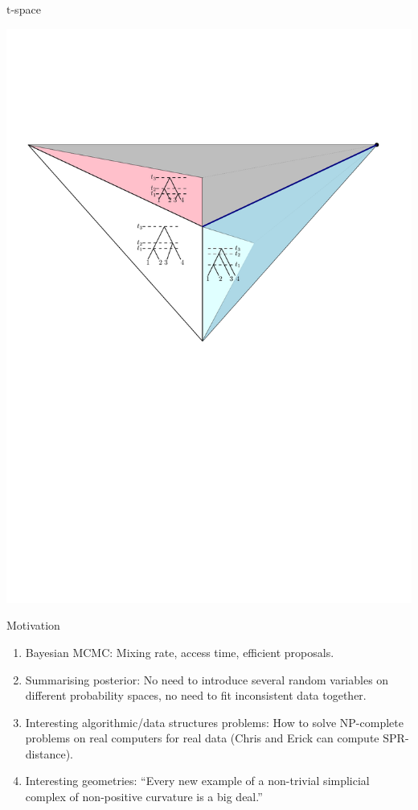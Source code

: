 \documentclass{beamer}
\renewcommand{\t}{$\mathrm{t}$}
\newcommand{\MCMC}{$\mathrm{MCMC}$}
\newcommand{\SPR}{$\mathrm{SPR}$}
\theoremstyle{example}
\begin{document}
\begin{frame}{\t-space}
\begin{definition}
\includegraphics[width=\framewidth]{tSpace}
\end{definition}
\end{frame}

\begin{frame}{Motivation}
\begin{block}

\begin{enumerate}
\item Bayesian \MCMC: Mixing rate, access time, efficient proposals.
\item Summarising posterior: No need to introduce several random variables on different probability spaces, no need to fit inconsistent data together.
\item Interesting algorithmic/data structures problems: How to solve NP-complete problems on real computers for real data (Chris and Erick can compute \SPR-distance).
\item Interesting geometries: ``Every new example of a non-trivial simplicial complex of non-positive curvature is a big deal.''
\end{enumerate}
\end{block}
\end{frame}
\end{document}
